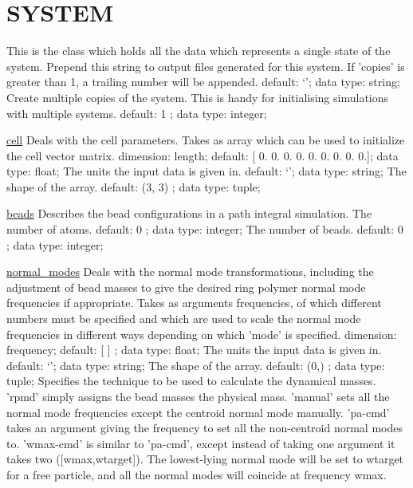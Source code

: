 \section{SYSTEM}
\label{SYSTEM}
\begin{ipifield}{}%
{This is the class which holds all the data which represents a single state of the system.}%
{}%
{%
{Prepend this string to output files generated for this system. If 'copies' is greater than 1, a trailing number will be appended.}%
{default: `'; data type: string; }%
%
{Create multiple copies of the system. This is handy for initialising simulations with multiple systems.}%
{default:  1 ; data type: integer; }%
}
\begin{ipifield}{\hyperref[CELL]{cell}}%
{Deals with the cell parameters. Takes as array which can be used to initialize the cell vector matrix.}%
{dimension: length; default: 
      [ 0.  0.  0.  0.  0.  0.  0.  0.  0.]; data type: float; }%
{%
{The units the input data is given in.}%
{default: `'; data type: string; }%
%
{The shape of the array.}%
{default:  (3, 3) ; data type: tuple; }%
}
\end{ipifield}
\begin{ipifield}{\hyperref[BEADS]{beads}}%
{Describes the bead configurations in a path integral simulation.}%
{}%
{%
{The number of atoms.}%
{default:  0 ; data type: integer; }%
%
{The number of beads.}%
{default:  0 ; data type: integer; }%
}
\end{ipifield}
\begin{ipifield}{\hyperref[NORMALMODES]{normal\_modes}}%
{Deals with the normal mode transformations, including the adjustment of bead masses to give the desired ring polymer normal mode frequencies if appropriate. Takes as arguments frequencies, of which different numbers must be specified and which are used to scale the normal mode frequencies in different ways depending on which 'mode' is specified.}%
{dimension: frequency; default:  [ ] ; data type: float; }%
{%
{The units the input data is given in.}%
{default: `'; data type: string; }%
%
{The shape of the array.}%
{default:  (0,) ; data type: tuple; }%
%
{Specifies the technique to be used to calculate the dynamical masses. 'rpmd' simply assigns the bead masses the physical mass. 'manual' sets all the normal mode frequencies except the centroid normal mode manually. 'pa-cmd' takes an argument giving the frequency to set all the non-centroid normal modes to. 'wmax-cmd' is similar to 'pa-cmd', except instead of taking one argument it takes two ([wmax,wtarget]). The lowest-lying normal mode will be set to wtarget for a free particle, and all the normal modes will coincide at frequency wmax. }%
}
\end{ipifield}
\end{ipifield}
